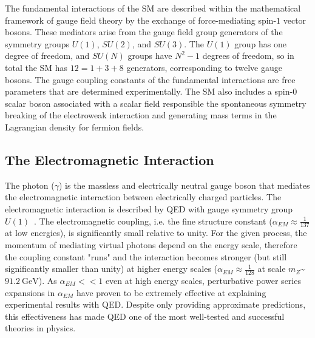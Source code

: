 The fundamental interactions of the SM are described within the mathematical framework of gauge field theory by the exchange of force-mediating spin-$1$ vector bosons.
These mediators arise from the gauge field group generators of the symmetry groups $U(1)$, $SU(2)$, and $SU(3)$.
The $U(1)$ group has one degree of freedom, and $SU(N)$ groups have $N^2 - 1$ degrees of freedom, so in total the SM has $12 = 1 + 3 + 8$ generators, corresponding to twelve gauge bosons.
The gauge coupling constants of the fundamental interactions are free parameters that are determined experimentally.
The SM also includes a spin-$0$ scalar boson associated with a scalar field responsible the spontaneous symmetry breaking of the electroweak interaction and generating mass terms in the Lagrangian density for fermion fields.

\subsection{The Electromagnetic Interaction}
The photon ($\gamma$) is the massless and electrically neutral gauge boson that mediates the electromagnetic interaction between electrically charged particles.
The electromagnetic interaction is described by QED with gauge symmetry group $U(1)$~\cite{nagashima_2013_V1}.
The electromagnetic coupling, i.e. the fine structure constant ($\alpha_{EM} \approx \frac{1}{137}$ at low energies), is significantly small relative to unity.
For the given process, the momentum of mediating virtual photons depend on the energy scale, therefore the coupling constant "runs" and the interaction becomes stronger (but still significantly smaller than unity) at higher energy scales ($\alpha_{EM} \approx \frac{1}{128}$ at scale $m_Z$\sim$\SI{91.2}{\GeV}$).
As $\alpha_{EM} << 1$ even at high energy scales, perturbative power series expansions in $\alpha_{EM}$ have proven to be extremely effective at explaining experimental results with QED.
Despite only providing approximate predictions, this effectiveness has made QED one of the most well-tested and successful theories in physics.

